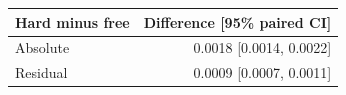 \begin{tabular}{lr}
\toprule
Hard minus free & Difference [95\% paired CI] \\
\midrule
Absolute & 0.0018 [0.0014, 0.0022] \\
Residual & 0.0009 [0.0007, 0.0011] \\
\bottomrule
\end{tabular}
